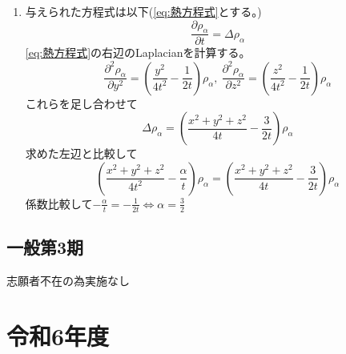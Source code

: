 \documentclass[dvipdfmx]{jsreport}
\begin{document}
\begin{souanswer}
\begin{enumerate}
	\item 与えられた方程式は以下(\eqref{eq:熱方程式}とする。)
\begin{equation} \tag{H}\label{eq:熱方程式}
	\frac{\partial \rho_\alpha}{\partial t}= \Delta\rho_\alpha
\end{equation}
	\eqref{eq:熱方程式}の右辺のLaplacianを計算する。
\begin{equation*}
	\frac{\partial^2 \rho_\alpha}{\partial y^2}= \left(\frac{y^2}{4t^2}- \frac{1}{2t}\right)\rho_\alpha,\ 
	\frac{\partial^2 \rho_\alpha}{\partial z^2}= \left(\frac{z^2}{4t^2}- \frac{1}{2t}\right)\rho_\alpha
\end{equation*}
	これらを足し合わせて
\begin{equation*}
	\Delta\rho_\alpha= \left(\frac{x^2+ y^2+ z^2}{4t}- \frac{3}{2t}\right)\rho_\alpha
\end{equation*}
	求めた左辺と比較して
\begin{equation*}
	\left(\frac{x^2+ y^2+ z^2}{4t^2}- \frac{\alpha}{t}\right)\rho_\alpha= \left(\frac{x^2+ y^2+ z^2}{4t}- \frac{3}{2t}\right)\rho_\alpha
\end{equation*}
	係数比較して$-\frac{\alpha}{t}= -\frac{1}{2t}\iff \alpha= \frac{3}{2}$

\end{enumerate}
\end{souanswer}

\section{一般第3期}
	志願者不在の為実施なし



\chapter{令和6年度}
\end{document}
